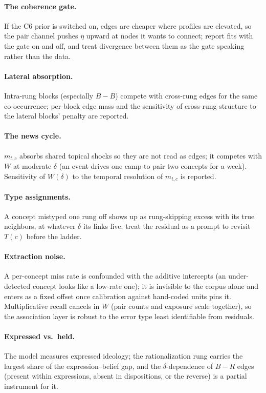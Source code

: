 \documentclass[11pt]{article}
\newcommand{\1}{\mathbb{1}}
\begin{document}
\paragraph{The coherence gate.} If the C6 prior is switched on, edges are cheaper where profiles are elevated, so the pair channel pushes $\eta$ upward at nodes it wants to connect; report fits with the gate on and off, and treat divergence between them as the gate speaking rather than the data.

\paragraph{Lateral absorption.} Intra-rung blocks (especially $B\!-\!B$) compete with cross-rung edges for the same co-occurrence; per-block edge mass and the sensitivity of cross-rung structure to the lateral blocks' penalty are reported.

\paragraph{The news cycle.} $m_{t,c}$ absorbs shared topical shocks so they are not read as edges; it competes with $W$ at moderate $\delta$ (an event drives one camp to pair two concepts for a week). Sensitivity of $W(\delta)$ to the temporal resolution of $m_{t,c}$ is reported.

\paragraph{Type assignments.} A concept mistyped one rung off shows up as rung-skipping excess with its true neighbors, at whatever $\delta$ its links live; treat the residual as a prompt to revisit $T(c)$ before the ladder.

\paragraph{Extraction noise.} A per-concept miss rate is confounded with the additive intercepts (an under-detected concept looks like a low-rate one); it is invisible to the corpus alone and enters as a fixed offset once calibration against hand-coded units pins it. Multiplicative recall cancels in $W$ (pair counts and exposure scale together), so the association layer is robust to the error type least identifiable from residuals.

\paragraph{Expressed vs.\ held.} The model measures expressed ideology; the rationalization rung carries the largest share of the expression--belief gap, and the $\delta$-dependence of $B\!-\!R$ edges (present within expressions, absent in dispositions, or the reverse) is a partial instrument for it.
\end{document}
